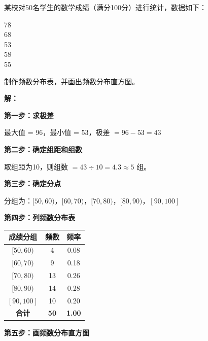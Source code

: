 \documentclass[12pt, a4paper]{ctexart}
\begin{document}
\begin{examplebox}[【例题3】制作频数分布表和直方图]
某校对50名学生的数学成绩（满分100分）进行统计，数据如下：

\begin{center}
78 \\
68 \\
53 \\
58 \\
55
\end{center}

制作频数分布表，并画出频数分布直方图。

\textbf{解：}

\textbf{第一步：求极差}

最大值 = 96，最小值 = 53，极差 $= 96 - 53 = 43$

\textbf{第二步：确定组距和组数}

取组距为10，则组数 $= 43 \div 10 = 4.3 \approx 5$ 组。

\textbf{第三步：确定分点}

分组为：$[50, 60)$，$[60, 70)$，$[70, 80)$，$[80, 90)$，$[90, 100]$

\textbf{第四步：列频数分布表}

\begin{center}
\begin{tabular}{|c|c|c|}
\hline
成绩分组 & 频数 & 频率 \\
\hline
$[50, 60)$ & 4 & 0.08 \\
\hline
$[60, 70)$ & 9 & 0.18 \\
\hline
$[70, 80)$ & 13 & 0.26 \\
\hline
$[80, 90)$ & 14 & 0.28 \\
\hline
$[90, 100]$ & 10 & 0.20 \\
\hline
\textbf{合计} & \textbf{50} & \textbf{1.00} \\
\hline
\end{tabular}
\end{center}

\textbf{第五步：画频数分布直方图}


\end{examplebox}
\end{document}
